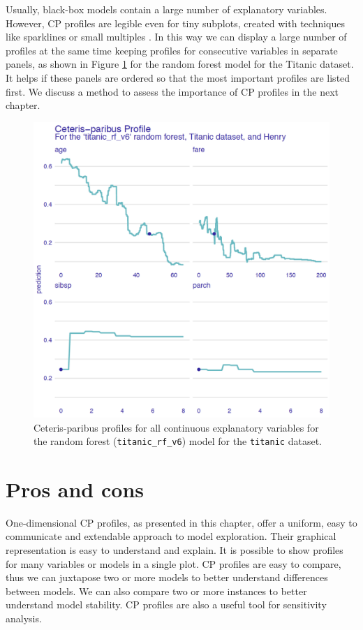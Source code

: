 \documentclass[]{krantz}
\begin{document}
Usually, black-box models contain a large number of explanatory variables. However, CP profiles are legible even for tiny subplots, created with techniques like sparklines or small multiples \citep{Tufte1986}. In this way we can display a large number of profiles at the same time keeping profiles for consecutive variables in separate panels, as shown in Figure \ref{fig:profileV4Rf} for the random forest model for the Titanic dataset. It helps if these panels are ordered so that the most important profiles are listed first. We discuss a method to assess the importance of CP profiles in the next chapter.



\begin{figure}

{\centering \includegraphics[width=0.7\linewidth]{figure/profile_v4_rf3} 

}

\caption{Ceteris-paribus profiles for all continuous explanatory variables for the random forest (\texttt{titanic\_rf\_v6}) model for the \texttt{titanic} dataset.}\label{fig:profileV4Rf}
\end{figure}

\hypertarget{CPProsCons}{%
\section{Pros and cons}\label{CPProsCons}}

One-dimensional CP profiles, as presented in this chapter, offer a uniform, easy to communicate and extendable approach to model exploration. Their graphical representation is easy to understand and explain. It is possible to show profiles for many variables or models in a single plot. CP profiles are easy to compare, thus we can juxtapose two or more models to better understand differences between models. We can also compare two or more instances to better understand model stability. CP profiles are also a useful tool for sensitivity analysis.
\end{document}
